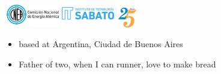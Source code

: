 \begin{frame}
\begin{columns}
\begin{column}{0.3\textwidth}
    \end{column}
    \begin{column}{0.7\textwidth} 
  \includegraphics[height=1cm]{./presentation/ISOLOGO-CNEA-HORIZONTAL.png}
      \hspace{1cm}
      \includegraphics[height=1cm]{./presentation/logo-isabt25.png}
      \hspace{1.5cm}
\begin{itemize}
\item based at Argentina, Ciudad de Buenos Aires
\item  Father of two, when I can runner, love to make bread
\end{itemize}
    \end{column}
  \end{columns}
\end{frame}
